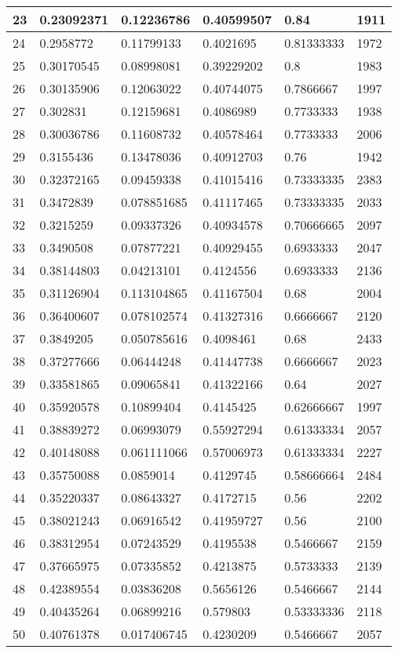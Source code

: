 \begin{longtable}{|l|l|l|l|l|l|}
23 & 0.23092371 & 0.12236786 & 0.40599507 & 0.84 & 1911 \\ \hline 
24 & 0.2958772 & 0.11799133 & 0.4021695 & 0.81333333 & 1972 \\ \hline 
25 & 0.30170545 & 0.08998081 & 0.39229202 & 0.8 & 1983 \\ \hline 
26 & 0.30135906 & 0.12063022 & 0.40744075 & 0.7866667 & 1997 \\ \hline 
27 & 0.302831 & 0.12159681 & 0.4086989 & 0.7733333 & 1938 \\ \hline 
28 & 0.30036786 & 0.11608732 & 0.40578464 & 0.7733333 & 2006 \\ \hline 
29 & 0.3155436 & 0.13478036 & 0.40912703 & 0.76 & 1942 \\ \hline 
30 & 0.32372165 & 0.09459338 & 0.41015416 & 0.73333335 & 2383 \\ \hline 
31 & 0.3472839 & 0.078851685 & 0.41117465 & 0.73333335 & 2033 \\ \hline 
32 & 0.3215259 & 0.09337326 & 0.40934578 & 0.70666665 & 2097 \\ \hline 
33 & 0.3490508 & 0.07877221 & 0.40929455 & 0.6933333 & 2047 \\ \hline 
34 & 0.38144803 & 0.04213101 & 0.4124556 & 0.6933333 & 2136 \\ \hline 
35 & 0.31126904 & 0.113104865 & 0.41167504 & 0.68 & 2004 \\ \hline 
36 & 0.36400607 & 0.078102574 & 0.41327316 & 0.6666667 & 2120 \\ \hline 
37 & 0.3849205 & 0.050785616 & 0.4098461 & 0.68 & 2433 \\ \hline 
38 & 0.37277666 & 0.06444248 & 0.41447738 & 0.6666667 & 2023 \\ \hline 
39 & 0.33581865 & 0.09065841 & 0.41322166 & 0.64 & 2027 \\ \hline 
40 & 0.35920578 & 0.10899404 & 0.4145425 & 0.62666667 & 1997 \\ \hline 
41 & 0.38839272 & 0.06993079 & 0.55927294 & 0.61333334 & 2057 \\ \hline 
42 & 0.40148088 & 0.061111066 & 0.57006973 & 0.61333334 & 2227 \\ \hline 
43 & 0.35750088 & 0.0859014 & 0.4129745 & 0.58666664 & 2484 \\ \hline 
44 & 0.35220337 & 0.08643327 & 0.4172715 & 0.56 & 2202 \\ \hline 
45 & 0.38021243 & 0.06916542 & 0.41959727 & 0.56 & 2100 \\ \hline 
46 & 0.38312954 & 0.07243529 & 0.4195538 & 0.5466667 & 2159 \\ \hline 
47 & 0.37665975 & 0.07335852 & 0.4213875 & 0.5733333 & 2139 \\ \hline 
48 & 0.42389554 & 0.03836208 & 0.5656126 & 0.5466667 & 2144 \\ \hline 
49 & 0.40435264 & 0.06899216 & 0.579803 & 0.53333336 & 2118 \\ \hline 
50 & 0.40761378 & 0.017406745 & 0.4230209 & 0.5466667 & 2057 \\ \hline 
\end{longtable}